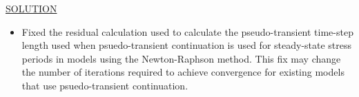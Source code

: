 	\underline{SOLUTION}
	\begin{itemize}
		\item Fixed the residual calculation used to calculate the pseudo-transient time-step length used when psuedo-transient continuation is used for steady-state stress periods in models using the Newton-Raphson method. This fix may change the number of iterations required to achieve convergence for existing models that use psuedo-transient continuation. 
	\end{itemize}


